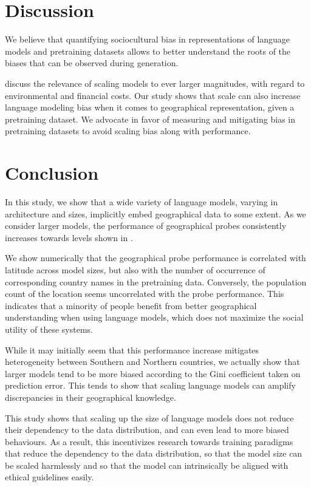 \section{Discussion}
\label{sec:discussion}
We believe that quantifying sociocultural bias in representations of language models and pretraining datasets allows to better understand the roots of the biases that can be observed during generation.

\citet{parrots_bender} discuss the relevance of scaling models to ever larger magnitudes, with regard to environmental and financial costs. Our study shows that scale can also increase language modeling bias when it comes to geographical representation, given a pretraining dataset. We advocate in favor of measuring and mitigating bias in pretraining datasets to avoid scaling bias along with performance.

\section*{Conclusion}
In this study, we show that a wide variety of language models, varying in architecture and sizes, implicitly embed geographical data to some extent. As we consider larger models, the performance of geographical probes consistently increases towards levels shown in \citet{gurnee2023language}.

We show numerically that the geographical probe performance is correlated with latitude across model sizes, but also with the number of occurrence of corresponding country names in the pretraining data. Conversely, the population count of the location seems uncorrelated with the probe performance. This indicates that a minority of people benefit from better geographical understanding when using language models, which does not maximize the social utility of these systems.

While it may initially seem that this performance increase mitigates heterogeneity between Southern and Northern countries, we actually show that larger models tend to be more biased according to the Gini coefficient taken on prediction error. This tends to show that scaling language models can amplify discrepancies in their geographical knowledge.

\vspace{2em}

This study shows that scaling up the size of language models does not reduce their dependency to the data distribution, and can even lead to more biased behaviours. As a result, this incentivizes research towards training paradigms that reduce the dependency to the data distribution, so that the model size can be scaled harmlessly and so that the model can intrinsically be aligned with ethical guidelines easily.



